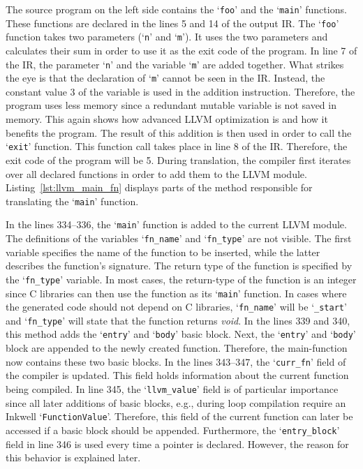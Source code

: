 The source program on the left side contains the `\texttt{foo}' and the `\texttt{main}' functions.
These functions are declared in the lines 5 and 14 of the output IR\@.
The `\texttt{foo}' function takes two parameters (`\texttt{n}' and `\texttt{m}').
It uses the two parameters and calculates their sum in order to use it as the exit code of the program.
In line 7 of the IR, the parameter `\texttt{n}' and the variable `\texttt{m}' are added together.
What strikes the eye is that the declaration of `\texttt{m}' cannot be seen in the IR\@.
Instead, the constant value 3 of the variable is used in the addition instruction.
Therefore, the program uses less memory since a redundant mutable variable is not saved in memory.
This again shows how advanced LLVM optimization is and how it benefits the program.
The result of this addition is then used in order to call the `\texttt{exit}' function.
This function call takes place in line 8 of the IR\@.
Therefore, the exit code of the program will be 5.
During translation, the compiler first iterates over all declared functions in order to add them to the LLVM module.
Listing~\ref{lst:llvm_main_fn} displays parts of the method responsible for translating the `\texttt{main}' function.


In the lines 334--336, the `\texttt{main}' function is added to the current LLVM module.
The definitions of the variables `\texttt{fn\_name}' and `\texttt{fn\_type}' are not visible.
The first variable specifies the name of the function to be inserted, while the latter describes the function's signature.
The return type of the function is specified by the `\texttt{fn\_type}' variable.
In most cases, the return-type of the function is an integer since C libraries can then use the function as its `\texttt{main}' function.
In cases where the generated code should not depend on C libraries, `\Verb|fn_name|' will be `\Verb|_start|' and `\Verb|fn_type|' will state that the function returns \emph{void}.
In the lines 339 and 340, this method adds the `\texttt{entry}' and `\texttt{body}' basic block.
Next, the `\texttt{entry}' and `\texttt{body}' block are appended to the newly created function.
Therefore, the main-function now contains these two basic blocks.
In the lines 343--347, the `\Verb|curr_fn|' field of the compiler is updated.
This field holds information about the current function being compiled.
In line 345, the `\Verb|llvm_value|' field is of particular importance since all later additions of basic blocks, e.g., during loop compilation require an Inkwell `\texttt{FunctionValue}'.
Therefore, this field of the current function can later be accessed if a basic block should be appended.
Furthermore, the `\Verb|entry_block|' field in line 346 is used every time a pointer is declared.
However, the reason for this behavior is explained later.

